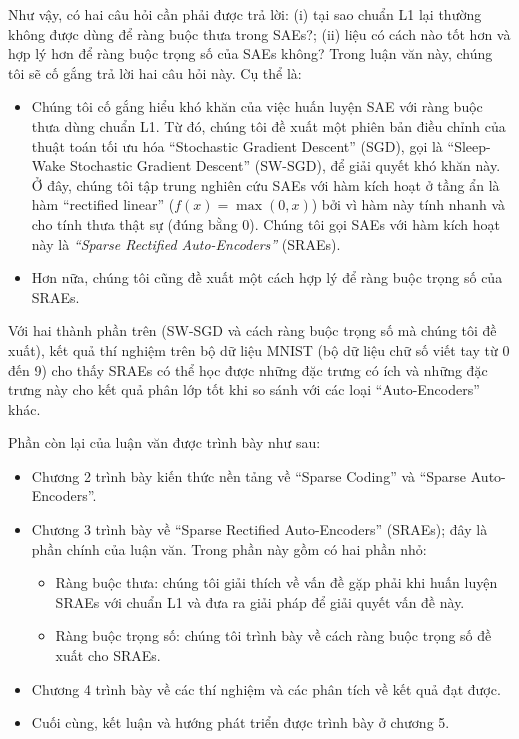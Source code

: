 Như vậy, có hai câu hỏi cần phải được trả lời: (i) tại sao chuẩn L1 lại thường không được dùng để ràng buộc thưa trong SAEs?; (ii) liệu có cách nào tốt hơn và hợp lý hơn để ràng buộc trọng số của SAEs không? Trong luận văn này, chúng tôi sẽ cố gắng trả lời hai câu hỏi này. Cụ thể là:
\begin{itemize}
	\item Chúng tôi cố gắng hiểu khó khăn của việc huấn luyện SAE với ràng buộc thưa dùng chuẩn L1. Từ đó, chúng tôi đề xuất một phiên bản điều chỉnh của thuật toán tối ưu hóa ``Stochastic Gradient Descent'' (SGD), gọi là ``Sleep-Wake Stochastic Gradient Descent'' (SW-SGD), để giải quyết khó khăn này. Ở đây, chúng tôi tập trung nghiên cứu SAEs với hàm kích hoạt ở tầng ẩn là hàm ``rectified linear'' ($f(x) = \max(0, x)$) bởi vì hàm này tính nhanh và cho tính thưa thật sự (đúng bằng 0). Chúng tôi gọi SAEs với hàm kích hoạt này là \emph{``Sparse Rectified Auto-Encoders''} (SRAEs).
	\item Hơn nữa, chúng tôi cũng đề xuất một cách hợp lý để ràng buộc trọng số của SRAEs.
\end{itemize}

Với hai thành phần trên (SW-SGD và cách ràng buộc trọng số mà chúng tôi đề xuất), kết quả thí nghiệm trên bộ dữ liệu MNIST (bộ dữ liệu chữ số viết tay từ 0 đến 9) cho thấy SRAEs có thể học được những đặc trưng có ích và những đặc trưng này cho kết quả phân lớp tốt khi so sánh với các loại ``Auto-Encoders'' khác.

Phần còn lại của luận văn được trình bày như sau:
\begin{itemize}
	\item Chương 2 trình bày kiến thức nền tảng về ``Sparse Coding'' và ``Sparse Auto-Encoders''.
	\item Chương 3 trình bày về ``Sparse Rectified Auto-Encoders'' (SRAEs); đây là phần chính của luận văn. Trong phần này gồm có hai phần nhỏ:
	\begin{itemize}
		\item Ràng buộc thưa: chúng tôi giải thích về vấn đề gặp phải khi huấn luyện SRAEs với chuẩn L1 và đưa ra giải pháp để giải quyết vấn đề này.
		\item Ràng buộc trọng số: chúng tôi trình bày về cách ràng buộc trọng số đề xuất cho SRAEs.
	\end{itemize}
	\item Chương 4 trình bày về các thí nghiệm và các phân tích về kết quả đạt được.
	\item Cuối cùng, kết luận và hướng phát triển được trình bày ở chương 5.
\end{itemize}